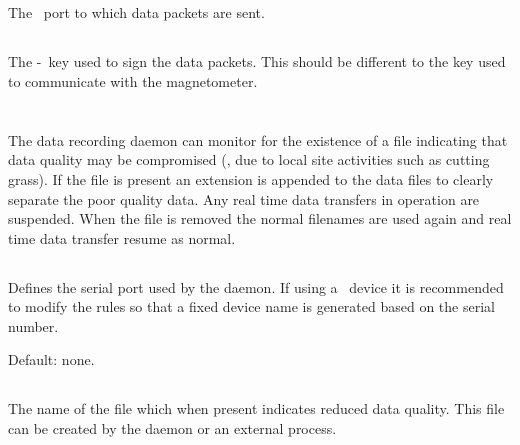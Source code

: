 \subsection{}
The \udp\ port to which data packets are sent.

\subsection{}
The \hmac-\mdfive\ key used to sign the data packets. This should be
different to the key used to communicate with the magnetometer.

\section{\code{[dataqualitymonitor]}}

The data recording daemon can monitor for the existence of a file
indicating that data quality may be compromised (\eg, due to local
site activities such as cutting grass). If the file is present an
extension is appended to the data files to clearly separate the poor
quality data. Any real time data transfers in operation are
suspended. When the file is removed the normal filenames are used
again and real time data transfer resume as normal.

\subsection{}
Defines the serial port used by the 
daemon. If using a \usb\ device it is recommended to modify the
 rules so that a fixed device name is generated based on
the serial number. 


Default: none.

\subsection{}
The name of the file which when present indicates reduced data
quality. This file can be created by the 
daemon or an external process.

